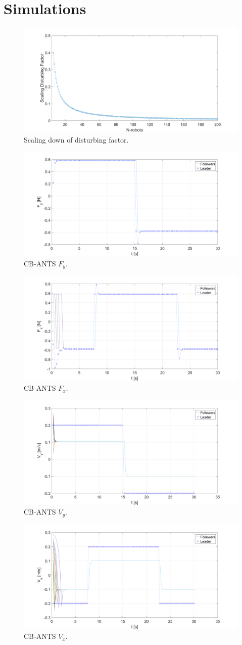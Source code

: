 \documentclass[letterpaper, 10 pt, conference]{ieeeconf}
\begin{document}
\section{Simulations}\label{sim}
\begin{figure}[!h]
	\includegraphics[width=.53\textwidth]{figures/scalingFactorDisturbance.png}
	\centering
	\caption{Scaling down of disturbing factor.}
	\label{scaling}
\end{figure}
\begin{figure}[!h]
	\includegraphics[width=.53\textwidth]{figures/CB_ANTS_Fy.png}
	\centering
	\caption{CB-ANTS $F_y$.}
	\label{fcbfy}
\end{figure}
\begin{figure}[!h]
	\includegraphics[width=.53\textwidth]{figures/CB_ANTS_Fx.png}
	\centering
	\caption{CB-ANTS $F_x$.}
	\label{fcbfx}
\end{figure}
\begin{figure}[!h]
	\includegraphics[width=.53\textwidth]{figures/CB_ANTS_Vy.png}
	\centering
	\caption{CB-ANTS $V_y$.}
	\label{fcbvy}
\end{figure}
\begin{figure}[!h]
	\includegraphics[width=.53\textwidth]{figures/CB_ANTS_Vx.png}
	\centering
	\caption{CB-ANTS $V_x$.}
	\label{fcbvx}
\end{figure}
\end{document}
